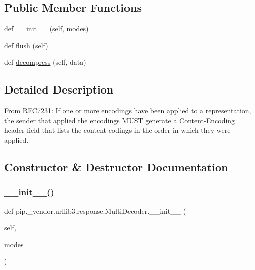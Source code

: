 \subsection*{Public Member Functions}
\begin{DoxyCompactItemize}
\item 
def \hyperlink{classpip_1_1__vendor_1_1urllib3_1_1response_1_1MultiDecoder_ad6619054639481903b4e12f4ecc05665}{\+\_\+\+\_\+init\+\_\+\+\_\+} (self, modes)
\item 
def \hyperlink{classpip_1_1__vendor_1_1urllib3_1_1response_1_1MultiDecoder_abcdc16b7228eff1dc2658cac9b43f0c3}{flush} (self)
\item 
def \hyperlink{classpip_1_1__vendor_1_1urllib3_1_1response_1_1MultiDecoder_ad986b34fdb04727406ffba0aee089e13}{decompress} (self, data)
\end{DoxyCompactItemize}


\subsection{Detailed Description}
\begin{DoxyVerb}From RFC7231:
    If one or more encodings have been applied to a representation, the
    sender that applied the encodings MUST generate a Content-Encoding
    header field that lists the content codings in the order in which
    they were applied.
\end{DoxyVerb}
 

\subsection{Constructor \& Destructor Documentation}
\mbox{\label{classpip_1_1__vendor_1_1urllib3_1_1response_1_1MultiDecoder_ad6619054639481903b4e12f4ecc05665}} 
\subsubsection{\texorpdfstring{\+\_\+\+\_\+init\+\_\+\+\_\+()}{\_\_init\_\_()}}
{\footnotesize\ttfamily def pip.\+\_\+vendor.\+urllib3.\+response.\+Multi\+Decoder.\+\_\+\+\_\+init\+\_\+\+\_\+ (\begin{DoxyParamCaption}\item[{}]{self,  }\item[{}]{modes }\end{DoxyParamCaption})}



